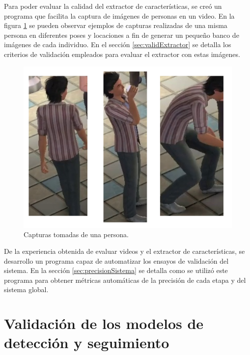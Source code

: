 Para poder evaluar la calidad del extractor de características, se creó un programa que facilita la captura de imágenes de personas en un video. En la figura \ref{fig:imagenesCrop} se pueden observar ejemplos de capturas realizadas de una misma persona en diferentes poses y locaciones a fin de generar un pequeño banco de imágenes de cada individuo. En el sección \ref{sec:validExtractor} se detalla los criterios de validación empleados para evaluar el extractor con estas imágenes.

\newpage

\begin{figure}[ht]
	\centering
	\includegraphics[scale=.45]{./Figures/imagenesCrop.png}
	\caption{Capturas tomadas de una persona.}
	\label{fig:imagenesCrop}
\end{figure}

De la experiencia obtenida de evaluar videos y el extractor de características, se desarrollo un programa capaz de automatizar los ensayos de validación del sistema. En la sección \ref{sec:precisionSistema} se detalla como se utilizó este programa para obtener métricas automáticas de la precisión de cada etapa y del sistema global.



\section{Validación de los modelos de detección y seguimiento}
\label{sec:validDetectorSeguidor}

